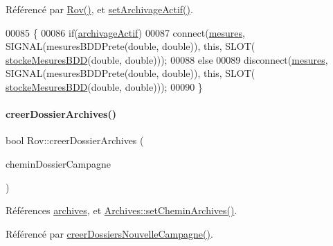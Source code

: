 Référencé par \hyperlink{class_rov_a5dddd3bd156c134848078296087d090c}{Rov()}, et \hyperlink{class_rov_abbe2eb87a00b651c8259c0c7abca3edd}{set\+Archivage\+Actif()}.


\begin{DoxyCode}
00085 \{
00086     \textcolor{keywordflow}{if}(\hyperlink{class_rov_a659da5fe3636356b006a8e08a8433dd3}{archivageActif})
00087         connect(\hyperlink{class_rov_af37589b38493e4bd99702587db2d28a8}{mesures}, SIGNAL(mesuresBDDPrete(\textcolor{keywordtype}{double}, \textcolor{keywordtype}{double})), \textcolor{keyword}{this}, SLOT(
      \hyperlink{class_rov_adab08abfde381c2915695489b34da6b4}{stockeMesuresBDD}(\textcolor{keywordtype}{double}, \textcolor{keywordtype}{double})));
00088     \textcolor{keywordflow}{else}
00089         disconnect(\hyperlink{class_rov_af37589b38493e4bd99702587db2d28a8}{mesures}, SIGNAL(mesuresBDDPrete(\textcolor{keywordtype}{double}, \textcolor{keywordtype}{double})), \textcolor{keyword}{this}, SLOT(
      \hyperlink{class_rov_adab08abfde381c2915695489b34da6b4}{stockeMesuresBDD}(\textcolor{keywordtype}{double}, \textcolor{keywordtype}{double})));
00090 \}
\end{DoxyCode}
\mbox{\label{class_rov_a53f656be57fa1eb7b93e03095a597439}} 
\paragraph{\texorpdfstring{creer\+Dossier\+Archives()}{creerDossierArchives()}}
{\footnotesize\ttfamily bool Rov\+::creer\+Dossier\+Archives (\begin{DoxyParamCaption}\item[{Q\+String}]{chemin\+Dossier\+Campagne }\end{DoxyParamCaption})\hspace{0.3cm}{\ttfamily [private]}}



Références \hyperlink{class_rov_ad41ed46f169f28da226a979f70c4d8a4}{archives}, et \hyperlink{class_archives_a899e95a34c2a6f79b9a25355b5bf9cb6}{Archives\+::set\+Chemin\+Archives()}.



Référencé par \hyperlink{class_rov_a970f36e93f9dbd22734db571b21ceb04}{creer\+Dossiers\+Nouvelle\+Campagne()}.


